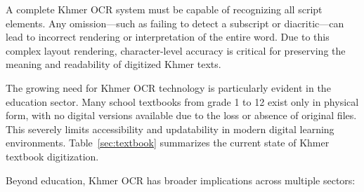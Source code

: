 A complete Khmer OCR system must be capable of recognizing all script elements. Any omission—such as failing to detect a subscript or diacritic—can lead to incorrect rendering or interpretation of the entire word. Due to this complex layout rendering, character-level accuracy is critical for preserving the meaning and readability of digitized Khmer texts.

The growing need for Khmer OCR technology is particularly evident in the education sector. Many school textbooks from grade 1 to 12 exist only in physical form, with no digital versions available due to the loss or absence of original files. This severely limits accessibility and updatability in modern digital learning environments. Table~\ref{sec:textbook} summarizes the current state of Khmer textbook digitization.


\begin{table}[ht]
    \caption{Current State of Khmer Textbook Digitization in Cambodia's Education System}
    \vspace{10pt}
    \label{sec:textbook}
\end{table}

Beyond education, Khmer OCR has broader implications across multiple sectors:

